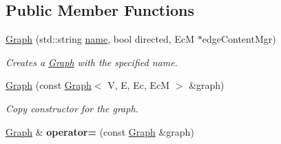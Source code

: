 \subsection*{Public Member Functions}
\begin{DoxyCompactItemize}
\item 
\hyperlink{classrepast_1_1_graph_ae2a9ad624d6fd581450243cd49e4ffe2}{Graph} (std\-::string \hyperlink{classrepast_1_1_projection_ab60a0ab4f584685780307d7431b61800}{name}, bool directed, Ec\-M $\ast$edge\-Content\-Mgr)
\begin{DoxyCompactList}\small\item\em Creates a \hyperlink{classrepast_1_1_graph}{Graph} with the specified name. \end{DoxyCompactList}\item 
\hypertarget{classrepast_1_1_graph_ad9e5b7105b55f1e967dff196e83a1621}{\hyperlink{classrepast_1_1_graph_ad9e5b7105b55f1e967dff196e83a1621}{Graph} (const \hyperlink{classrepast_1_1_graph}{Graph}$<$ V, E, Ec, Ec\-M $>$ \&graph)}\label{classrepast_1_1_graph_ad9e5b7105b55f1e967dff196e83a1621}

\begin{DoxyCompactList}\small\item\em Copy constructor for the graph. \end{DoxyCompactList}\item 
\hypertarget{classrepast_1_1_graph_a2404ed301bcecb8af4d1d45bd5de4c8a}{\hyperlink{classrepast_1_1_graph}{Graph} \& {\bfseries operator=} (const \hyperlink{classrepast_1_1_graph}{Graph} \&graph)}\label{classrepast_1_1_graph_a2404ed301bcecb8af4d1d45bd5de4c8a}


\end{DoxyCompactItemize}
